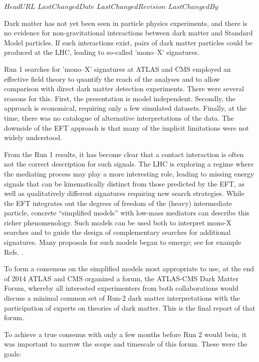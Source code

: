 \svnidlong
{$HeadURL$}
{$LastChangedDate$}
{$LastChangedRevision$}
{$LastChangedBy$}

Dark matter has not yet been seen in particle physics experiments, and
there is no evidence for non-gravitational interactions between dark
matter and Standard Model particles.  If such interactions exist,
pairs of dark matter particles could be produced at the LHC, leading
to so-called 'mono--X' signatures.

Run 1 searches for 'mono--X' signatures at ATLAS and CMS employed an
effective field theory \cite{Goodman:2010ku} to quantify the reach of
the analyses and to allow comparison with direct dark matter detection
experiments. There were several reasons for this.  First, the
presentation is model independent.  Secondly, the approach is
economical, requiring only a few simulated datasets.  Finally, at the
time, there was no catalogue of alternative interpretations of the
data. The downside of the EFT approach is that many of the implicit
limitations were not widely understood.

From the Run 1 results, it has become clear \cite{Busoni:2013lha} that
a contact interaction is often not the correct description for such
signals. The LHC is exploring a regime where the mediating process may
play a more interesting role, leading to missing energy signals that
can be kinematically distinct from those predicted by the EFT, as well
as qualitatively different signatures requiring new search
strategies. While the EFT integrates out the degrees of freedom of the
(heavy) intermediate particle, concrete ``simplified models'' with
low-mass mediators \cite{Alves:2011wf} can describe this richer
phenomenology. Such models can be used both to interpret mono-­X
searches and to guide the design of complementary searches for
additional signatures. Many proposals for such models began to emerge;
see for example
Refs. \cite{Tait:2013,Buchmueller:2013dya,Yavin:14092893,Malik:2014ggr,Harris:2014hga,Buckley:2014fba}.

To form a consensus on the simplified models most appropriate to use,
at the end of 2014 ATLAS and CMS organized a forum, the ATLAS-­CMS
Dark Matter Forum, whereby all interested experimenters from both
collaborations would discuss a minimal common set of Run-2 dark matter
interpretations with the participation of experts on theories of dark
matter. This is the final report of that forum.

To achieve a true consenus with only a few months before Run 2 would
bein, it was important to narrow the scope and timescale of this
forum. These were the goals:

